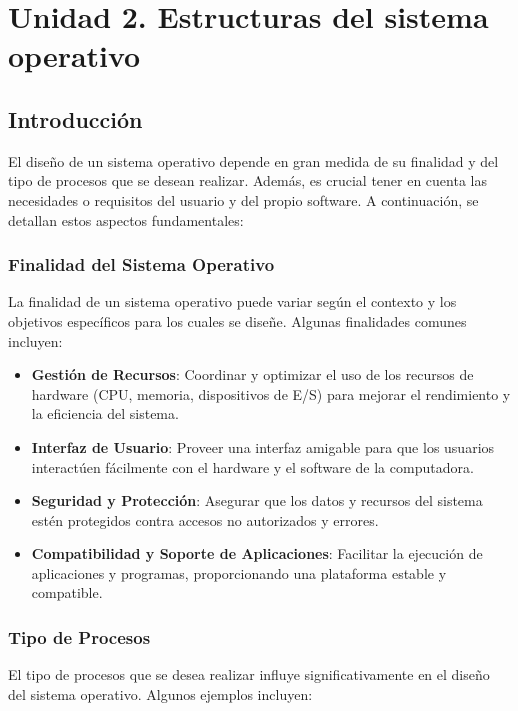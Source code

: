 \chapter{Unidad 2. Estructuras del sistema operativo}

\section{Introducción}
El diseño de un sistema operativo depende en gran medida de su finalidad y del tipo de procesos que se desean realizar. Además, es crucial tener en cuenta las necesidades o requisitos del usuario y del propio software.
 A continuación, se detallan estos aspectos fundamentales:

\subsection{Finalidad del Sistema Operativo}

La finalidad de un sistema operativo puede variar según el contexto y los objetivos específicos para los cuales se diseñe. Algunas finalidades comunes incluyen:

\begin{itemize}
	\item \textbf{Gestión de Recursos}: Coordinar y optimizar el uso de los recursos de hardware (CPU, memoria, dispositivos de E/S) para mejorar el rendimiento y la eficiencia del sistema.
	\item \textbf{Interfaz de Usuario}: Proveer una interfaz amigable para que los usuarios interactúen fácilmente con el hardware y el software de la computadora.
	\item \textbf{Seguridad y Protección}: Asegurar que los datos y recursos del sistema estén protegidos contra accesos no autorizados y errores.
	\item \textbf{Compatibilidad y Soporte de Aplicaciones}: Facilitar la ejecución de aplicaciones y programas, proporcionando una plataforma estable y compatible.
\end{itemize}

\subsection{ Tipo de Procesos}

El tipo de procesos que se desea realizar influye significativamente en el diseño del sistema operativo. Algunos ejemplos incluyen:

